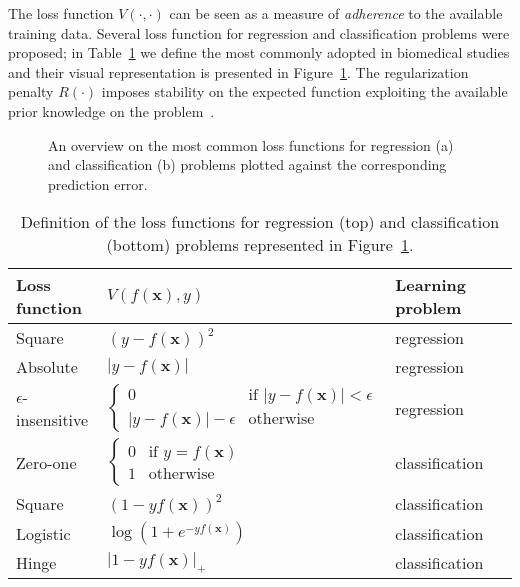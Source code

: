     The loss function $V(\cdot,\cdot)$ can be seen as a measure of \textit{adherence} to the available training data. Several loss function for regression and classification problems were proposed; in Table~\ref{tab:losses} we define the most commonly adopted in biomedical studies and their visual representation is presented in Figure~\ref{fig:loss}. The regularization penalty $R(\cdot)$ imposes stability on the expected function exploiting the available prior knowledge on the problem~\cite{tikhonov1963solution}.

    \begin{figure}[!ht]
        \centering
        \caption{An overview on the most common loss functions for regression (a) and classification (b) problems plotted against the corresponding prediction error.}\label{fig:loss}
    \end{figure}


    \begin{table}[]
      \centering
      \caption{Definition of the loss functions for regression (top) and classification (bottom) problems represented in Figure~\ref{fig:loss}.}\label{tab:losses}
      \begin{tabular}{@{}ll@{}ll@{}}
        \toprule
        Loss function & $V(f(\bm{x}),y)$  & Learning problem           \\ \midrule
        Square                   & $(y - f(\bm{x}))^2$ & regression \\
        Absolute                 & $|y - f(\bm{x})|$ & regression   \\
        $\epsilon$-insensitive   & $\begin{cases}
            0 & \text{if } |y-f(\bm{x})| < \epsilon\\
            |y-f(\bm{x})| - \epsilon & \text{otherwise}
        \end{cases} $        & regression                 \\
        \midrule
        Zero-one               & $\begin{cases}
            0 & \text{if } y = f(\bm{x})\\
            1 & \text{otherwise}
        		\end{cases}$ & classification \\
        Square                 & $(1 - yf(\bm{x}))^2$ & classification  \\
        Logistic                 & $\log(1 + e^{-yf(\bm{x})})$ & classification  \\
        Hinge                 & $|1 - yf(\bm{x})|_+$ & classification  \\
        \bottomrule
      \end{tabular}
    \end{table}


